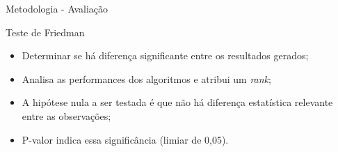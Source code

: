 \documentclass{beamer}
\begin{document}
\begin{frame}{Metodologia - Avaliação}
\setlength\leftmargini{1em}
\begin{block}{Teste de Friedman}
\begin{itemize}
\item Determinar se há diferença significante entre os resultados gerados;
\item Analisa as performances dos algoritmos e atribui um \textit{rank};
\item A hipótese nula a ser testada é que não há diferença estatística relevante entre as observações;
\item P-valor indica essa significância (limiar de 0,05).
\end{itemize}
\end{block}
\end{frame}
\end{document}
